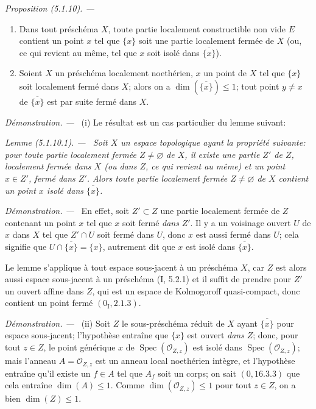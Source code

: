 \documentclass[10pt,oneside]{book}
\newcommand{\oldpage}[2][]{%
  \setcounter{footnote}{0}%
  \marginpar{\scriptsize\textbf{#1}~|~#2}\ignorespaces}
\newenvironment{proposition}[1][]{%
  \par\medskip\noindent\itshape Proposition (#1). ---\ }{\par}
\newenvironment{lemma}[1][]{%
  \par\medskip\noindent\itshape Lemme (#1). ---\ }{\par}
\newenvironment{proof}{%
  \par\medskip\noindent\textit{Démonstration. ---\ }}{\par}
\begin{document}
\begin{proposition}[5.1.10]
\label{IV.2.5.1.10-fr}
\begin{enumerate}
\item[(i)] Dans tout préschéma $X$, toute partie localement constructible non
vide $E$ contient un point $x$ tel que $\{x\}$ soit une partie localement
fermée de $X$ (ou, ce qui revient au même, tel que $x$ soit isolé dans
$\overline{\{x\}}$).
\item[(ii)] Soient $X$ un préschéma localement noethérien, $x$ un point de
$X$ tel que $\{x\}$ soit localement fermé dans $X$; alors on a
$\dim(\overline{\{x\}})\leq1$; tout point $y\ne x$ de
$\overline{\{x\}}$ est par suite fermé dans $X$.
\end{enumerate}
\end{proposition}

\begin{proof}
(i) Le résultat est un cas particulier du lemme suivant:
\end{proof}

\begin{lemma}[5.1.10.1]
\label{IV.2.5.1.10.1-fr}
Soit $X$ un espace topologique ayant la propriété suivante: pour toute partie
localement fermée $Z\ne\varnothing$ de $X$, il existe une partie $Z'$ de $Z$,
localement fermée dans $X$ (ou dans $Z$, ce qui revient au même) et un point
$x\in Z'$, fermé dans $Z'$. Alors toute partie localement fermée
$Z\ne\varnothing$ de $X$ contient un point $x$ isolé dans
$\overline{\{x\}}$.
\end{lemma}

\begin{proof}
En effet, soit $Z'\subset Z$ une partie localement fermée de $Z$ contenant un
point $x$ tel que $x$ soit fermé \emph{dans} $Z'$. Il y a un voisinage ouvert
$U$ de $x$ dans $X$ tel que $Z'\cap U$ soit fermé dans $U$, donc $x$ est aussi
fermé dans $U$; cela signifie que $U\cap\overline{\{x\}}=\{x\}$, autrement
dit que $x$ est isolé dans $\overline{\{x\}}$.

Le lemme s'applique à tout espace sous-jacent à un préschéma $X$, car $Z$ est
alors aussi espace sous-jacent à un préschéma (I, 5.2.1) et il suffit de
prendre pour $Z'$ un ouvert affine dans $Z$, qui est un espace de Kolmogoroff
quasi-compact, donc contient un point fermé $(0_{\mathrm I},2.1.3)$.
\end{proof}

\oldpage[IV-2]{89}

\begin{proof}
\textup{(ii)} Soit $Z$ le sous-préschéma réduit de $X$ ayant
$\overline{\{x\}}$ pour espace
sous-jacent; l'hypothèse entraîne que $\{x\}$ est ouvert \emph{dans} $Z$;
donc, pour tout $z\in Z$, le point générique $x$ de
$\operatorname{Spec}(\mathcal O_{Z,z})$ est isolé dans
$\operatorname{Spec}(\mathcal O_{Z,z})$; mais l'anneau
$A=\mathcal O_{Z,z}$ est un anneau local noethérien intègre, et l'hypothèse
entraîne qu'il existe un $f\in A$ tel que $A_f$ soit un corps; on sait
$(0,16.3.3)$ que cela entraîne $\dim(A)\leq1$. Comme
$\dim(\mathcal O_{Z,z})\leq1$ pour tout $z\in Z$, on a bien $\dim(Z)\leq1$.
\end{proof}
\end{document}
